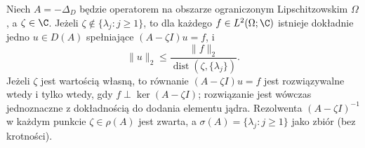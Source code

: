 \begin{twierdzenie}
\label{thm:pde12-fredholm}
Niech $A=-\Delta_D$ będzie operatorem na obszarze ograniczonym Lipschitzowskim $\Omega$, a $\zeta\in\C$.
Jeżeli $\zeta\notin\{\lambda_j:j\ge1\}$, to dla
każdego $f\in L^2(\Omega;\C)$ istnieje dokładnie jedno
$u\in D(A)$ spełniające $(A-\zeta I)u=f$, i
\[
\|u\|_2\le\frac{\|f\|_2}
{\operatorname{dist}(\zeta,\{\lambda_j\})}.
\]
Jeżeli $\zeta$ jest wartością własną, to równanie
$(A-\zeta I)u=f$ jest rozwiązywalne wtedy i tylko wtedy,
gdy $f\perp\ker(A-\zeta I)$; rozwiązanie jest wówczas
jednoznaczne z dokładnością do dodania elementu jądra.
Rezolwenta $(A-\zeta I)^{-1}$ w każdym punkcie
$\zeta\in\rho(A)$ jest zwarta, a
$\sigma(A)=\{\lambda_j:j\ge1\}$ jako zbiór (bez krotności).
\end{twierdzenie}
